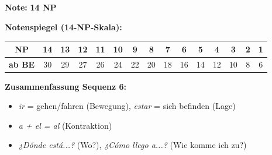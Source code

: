 \documentclass[11pt, a4paper]{article}
\newcommand{\lsg}[1]{\textcolor{loesung}{\textbf{#1}}}
\begin{document}
\vspace{10pt}

\begin{flushright}
\textbf{Note:} \lsg{14 NP}
\end{flushright}

\vspace{1em}

\textbf{Notenspiegel (14-NP-Skala):}

\begin{center}
\footnotesize
\begin{tabular}{|c|c|c|c|c|c|c|c|c|c|c|c|c|c|c|}
\hline
\textbf{NP} & 14 & 13 & 12 & 11 & 10 & 9 & 8 & 7 & 6 & 5 & 4 & 3 & 2 & 1 \\
\hline
\textbf{ab BE} & 30 & 29 & 27 & 26 & 24 & 22 & 20 & 18 & 16 & 14 & 12 & 10 & 8 & 6 \\
\hline
\end{tabular}
\end{center}

\vspace{1em}

\textcolor{loesung}{\textbf{Zusammenfassung Sequenz 6:}}
\begin{itemize}
    \item \textcolor{loesung}{\textit{ir} = gehen/fahren (Bewegung), \textit{estar} = sich befinden (Lage)}
    \item \textcolor{loesung}{\textit{a + el = al} (Kontraktion)}
    \item \textcolor{loesung}{\textit{¿Dónde está...?} (Wo?), \textit{¿Cómo llego a...?} (Wie komme ich zu?)}
\end{itemize}
\end{document}
